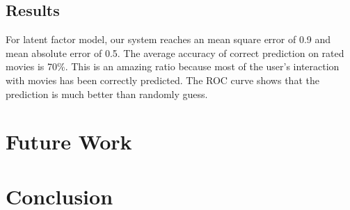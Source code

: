 \documentclass[12pt]{article}
\begin{document}
%

\subsection{Results}

For latent factor model, our system reaches an mean square error of 0.9 and mean absolute error of 0.5. The average accuracy of correct prediction on rated movies is 70\%. This is an amazing ratio because most of the user's interaction with movies has been correctly predicted. The ROC curve shows that the prediction is much better than randomly guess.

\section{Future Work}

\section{Conclusion}

%



\end{document}
